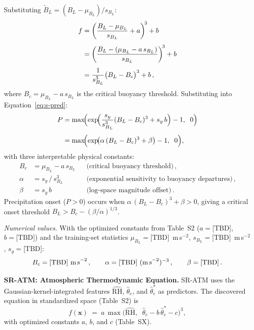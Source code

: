 Substituting $\tilde{B}_L = (B_L - \mu_{B_L})/s_{B_L}$:
%
\begin{align}
  f &= \left(\frac{B_L - \mu_{B_L}}{s_{B_L}} + a\right)^{\!3} + b
       \notag\\[4pt]
    &= \left(\frac{B_L - (\mu_{B_L} - a\,s_{B_L})}{s_{B_L}}\right)^{\!3} + b
       \notag\\[4pt]
    &= \frac{1}{s_{B_L}^3}\bigl(B_L - B_c\bigr)^3 + b\,,
  \label{eq:s-srbl-expand}
\end{align}
%
where $B_c = \mu_{B_L} - a\,s_{B_L}$ is the critical buoyancy threshold.
Substituting into Equation~\ref{eq:s-pred}:
%
\begin{align}
  P &= \max\!\Bigl(\exp\!\Bigl(
       \frac{s_y}{s_{B_L}^3}(B_L - B_c)^3 + s_y\,b
       \Bigr) - 1,\;\;0\Bigr) \notag\\[4pt]
    &= \max\!\Bigl(\exp\!\bigl(
       \alpha\,(B_L - B_c)^3 + \beta\bigr) - 1,\;\;0\Bigr),
  \label{eq:s-srbl-phys}
\end{align}
%
with three interpretable physical constants:
%
\begin{equation}
  \begin{aligned}
    B_c    &= \mu_{B_L} - a\,s_{B_L}
             &&\text{(critical buoyancy threshold)}\,,\\
    \alpha &= s_y\,/\,s_{B_L}^3
             &&\text{(exponential sensitivity to buoyancy departures)}\,,\\
    \beta  &= s_y\,b
             &&\text{(log-space magnitude offset)}\,.
  \end{aligned}
  \label{eq:s-srbl-constants}
\end{equation}
%
Precipitation onset ($P > 0$) occurs when $\alpha\,(B_L - B_c)^3 + \beta > 0$,
giving a critical onset threshold $B_L > B_c - (\beta/\alpha)^{1/3}$.

\vspace{0.3em}
\noindent\textit{Numerical values.}  With the optimized constants from
Table~S2 ($a = \text{[TBD]}$, $b = \text{[TBD]}$) and the training-set
statistics $\mu_{B_L} = \text{[TBD]}$~m\,s$^{-2}$,
$s_{B_L} = \text{[TBD]}$~m\,s$^{-2}$, $s_y = \text{[TBD]}$:
%
\begin{equation*}
  B_c = \text{[TBD]~m\,s}^{-2}\,,\qquad
  \alpha = \text{[TBD]~(m\,s}^{-2})^{-3}\,,\qquad
  \beta = \text{[TBD]}\,.
\end{equation*}


\vspace{1.0em}
\textbf{SR-ATM: Atmospheric Thermodynamic Equation.}
SR-ATM uses the Gaussian-kernel-integrated features $\widehat{\mathrm{RH}}$,
$\hat{\theta}_e$, and $\hat{\theta}_e^*$ as predictors.  The discovered
equation in standardized space (Table~S2) is
%
\begin{equation}
  f(\mathbf{x}) \;=\; a\,\max\!\bigl(\widehat{\mathrm{RH}},\;\;
    \hat{\theta}_e - b\,\hat{\theta}_e^* - c\bigr)^3,
  \label{eq:s-sratm-std}
\end{equation}
%
with optimized constants $a$, $b$, and $c$ (Table~SX).

